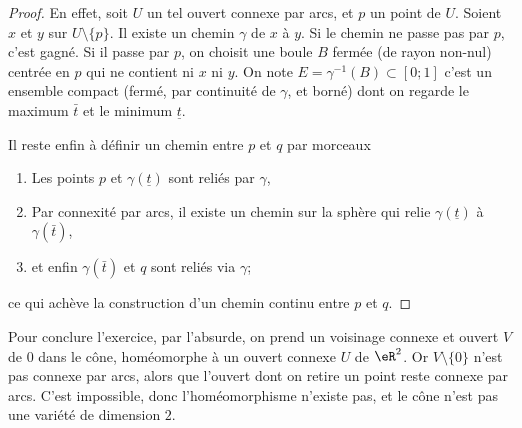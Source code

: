 \begin{proof}
	En effet, soit $U$ un tel ouvert connexe par arcs, et $p$ un point
	de $U$. Soient $x$ et $y$ sur $U\setminus\{p\}$. Il existe un
	chemin $\gamma$ de $x$ à $y$. Si le chemin ne passe pas par $p$,
	c'est gagné. Si il passe par $p$, on choisit une boule $B$ fermée
	(de rayon non-nul) centrée en $p$ qui ne contient ni $x$ ni
	$y$. On note
	\( E = \gamma^{-1}(B) \subset [0;1]\) c'est un ensemble compact
	(fermé, par continuité de $\gamma$, et borné) dont on regarde le
	maximum $\bar t$ et le minimum $\underline t$.

	Il reste enfin à définir un chemin entre $p$ et $q$ par morceaux
	\begin{enumerate}
		\item Les points $p$ et $\gamma(\underline t)$ sont reliés par
		      $\gamma$,
		\item Par connexité par arcs, il existe un chemin sur la sphère qui
		      relie $\gamma(\underline t)$ à $\gamma(\bar t)$,
		\item et enfin $\gamma(\bar t)$ et $q$ sont reliés via $\gamma$;
	\end{enumerate}
	ce qui achève la construction d'un chemin continu entre $p$ et $q$.
\end{proof}

Pour conclure l'exercice, par l'absurde, on prend un voisinage
connexe et ouvert $V$ de $0$ dans le cône, homéomorphe à un ouvert
connexe $U$ de $\eR^2$. Or $V\setminus\{0\}$ n'est pas connexe par
arcs, alors que l'ouvert dont on retire un point reste connexe par
arcs. C'est impossible, donc l'homéomorphisme n'existe pas, et le
cône n'est pas une variété de dimension $2$.
